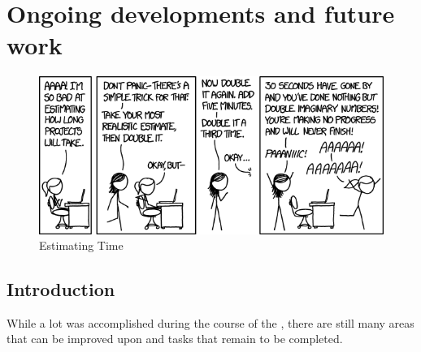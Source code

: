 \chapter{Ongoing developments and future work}
\label{chap:future_work}

\begin{figure}[H]
    \centering
    \includegraphics[width=\textwidth]{figures/estimating_time.png}
    \caption{Estimating Time \cite{xkcdEstimatingTime2016}}
    \label{fig:xkcd_time}
\end{figure}

\section{Introduction}
While a lot was accomplished during the course of the \master, there are still many areas that can be improved upon and tasks that remain to be completed.

